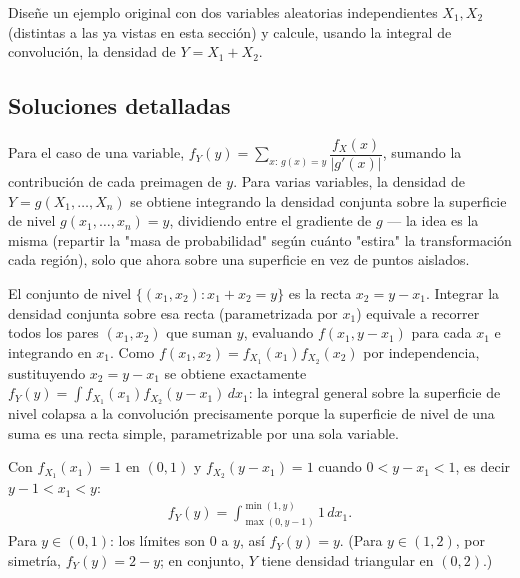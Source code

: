 \begin{problema}
	\label{prob:db5d952}
	Diseñe un ejemplo original con dos variables aleatorias independientes $X_1, X_2$ (distintas a las ya vistas en esta sección) y calcule, usando la integral de convolución, la densidad de $Y=X_1+X_2$.
\end{problema}

\subsection*{Soluciones detalladas}

\begin{solproblema}[prob:0b1575d]
	Para el caso de una variable, $f_Y(y) = \sum_{x:\,g(x)=y} \dfrac{f_X(x)}{|g'(x)|}$, sumando la contribución de cada preimagen de $y$. Para varias variables, la densidad de $Y=g(X_1,\ldots,X_n)$ se obtiene integrando la densidad conjunta sobre la superficie de nivel $g(x_1,\ldots,x_n)=y$, dividiendo entre el gradiente de $g$ — la idea es la misma (repartir la "masa de probabilidad" según cuánto "estira" la transformación cada región), solo que ahora sobre una superficie en vez de puntos aislados.
\end{solproblema}

\begin{solproblema}[prob:a8b056e]
	El conjunto de nivel $\{(x_1,x_2): x_1+x_2=y\}$ es la recta $x_2=y-x_1$. Integrar la densidad conjunta sobre esa recta (parametrizada por $x_1$) equivale a recorrer todos los pares $(x_1,x_2)$ que suman $y$, evaluando $f(x_1,y-x_1)$ para cada $x_1$ e integrando en $x_1$. Como $f(x_1,x_2)=f_{X_1}(x_1)f_{X_2}(x_2)$ por independencia, sustituyendo $x_2=y-x_1$ se obtiene exactamente $f_Y(y)=\int f_{X_1}(x_1)f_{X_2}(y-x_1)\,dx_1$: la integral general sobre la superficie de nivel colapsa a la convolución precisamente porque la superficie de nivel de una suma es una recta simple, parametrizable por una sola variable.
\end{solproblema}

\begin{solproblema}
	Con $f_{X_1}(x_1)=1$ en $(0,1)$ y $f_{X_2}(y-x_1)=1$ cuando $0<y-x_1<1$, es decir $y-1<x_1<y$:
	\begin{align*}
		f_Y(y) = \int_{\max(0,y-1)}^{\min(1,y)} 1\,dx_1.
	\end{align*}
	Para $y\in(0,1)$: los límites son $0$ a $y$, así $f_Y(y) = y$. (Para $y\in(1,2)$, por simetría, $f_Y(y)=2-y$; en conjunto, $Y$ tiene densidad triangular en $(0,2)$.)
\end{solproblema}

